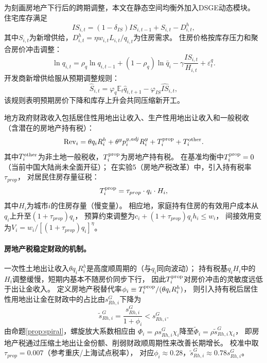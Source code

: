 \documentclass[UTF8,a4paper,12pt]{ctexart}
\theoremstyle{plain}
\theoremstyle{definition}
\theoremstyle{remark}
\newcommand{\E}{\mathbb{E}}
\newcommand{\Ry}{R^{y}}
\newcommand{\Rh}{R^{h}}
\begin{document}
为刻画房地产下行后的跨期调整，本文在静态空间均衡外加入DSGE动态模块。
住宅库存满足
\begin{equation}
  IS_{i,t}=(1-\delta_{IS})IS_{i,t-1}+S_{i,t}-D^h_{i,t},
  \label{eq:inventory}
\end{equation}
其中$S_{i,t}$为新增供给，$D^h_{i,t}=\eta w_{i,t}L_{i,t}/q_{i,t}$为住房需求。
住房价格按库存压力和聚合房价冲击调整：
\begin{equation}
  \ln q_{i,t}=\rho_q\ln q_{i,t-1}+(1-\rho_q)\ln\bar{q}_i
  -\gamma\frac{IS_{i,t}}{H_{i,t}}+\varepsilon_t^q.
  \label{eq:price_dyn}
\end{equation}
开发商新增供给服从预期调整规则：
\begin{equation}
  \widehat{S}_{i,t}=\varphi_q\E_t\widehat{q}_{i,t+1}-\varphi_{IS}\widehat{IS}_{i,t},
  \label{eq:developer_rule}
\end{equation}
该规则表明预期房价下降和库存上升会共同压缩新开工。

地方政府财政收入包括居住性用地出让收入、生产性用地出让收入和一般税收
（含潜在的房地产持有税）：
\begin{equation}
  \text{Rev}_i=\theta q_i\Rh_i+\theta^y p_i^{y,adj}\Ry_i+T_i^{\rm prop}+T_i^{\rm other}.
  \label{eq:revenue}
\end{equation}
其中$T_i^{\rm other}$为非土地一般税收，$T_i^{\rm prop}$为房地产持有税。
在基准均衡中$T_i^{\rm prop}=0$（当前中国大陆尚未全面开征）；
在实验5（房地产税改革）中，引入持有税率$\tau_{prop}$，
对居民住房存量征税：
\begin{equation}
  T_i^{\rm prop}=\tau_{prop}\cdot q_i\cdot H_i,
  \label{eq:prop_tax}
\end{equation}
其中$H_i$为城市$i$的住房存量（慢变量）。
相应地，家庭持有住房的有效用户成本从$q_i$上升至$(1+\tau_{prop})q_i$，
预算约束调整为$c_i+(1+\tau_{prop})q_i h_i\leq w_i$，
间接效用变为$V_i=w_i/[(1+\tau_{prop})q_i]^\eta$。

\paragraph{房地产税稳定财政的机制。}
一次性土地出让收入$\theta q_i\Rh_i$是高度顺周期的（与$q_i$同向波动）；
持有税基$q_i H_i$中的$H_i$调整缓慢，短期内基本不随房价同步下行，
因此$T_i^{\rm prop}$对房价冲击的灵敏度远低于出让金收入。
定义房地产税替代率$\phi_i\equiv T_i^{\rm prop}/(\theta q_i\Rh_i)$，
则引入持有税后居住性用地出让金在财政中的占比由$s_{Rh,i}^G$下降为
\begin{equation}
  \tilde{s}_{Rh,i}^G = \frac{s_{Rh,i}^G}{1+\phi_i} < s_{Rh,i}^G.
  \label{eq:prop_tax_share}
\end{equation}
由命题\ref{prop:spiral}，螺旋放大系数相应由
$\Phi_i=\rho s_{Rh,i}^G\chi_i$降至$\tilde{\Phi}_i=\rho\tilde{s}_{Rh,i}^G\chi_i$，
即房地产税通过压缩土地出让金份额、削弱财政顺周期性来改善长期增长。
校准中取$\tau_{prop}=0.007$（参考重庆/上海试点税率），
对应$\phi_i\approx 0.28$，$\tilde{s}_{Rh,i}^G\approx 0.78 s_{Rh,i}^G$。
\end{document}
